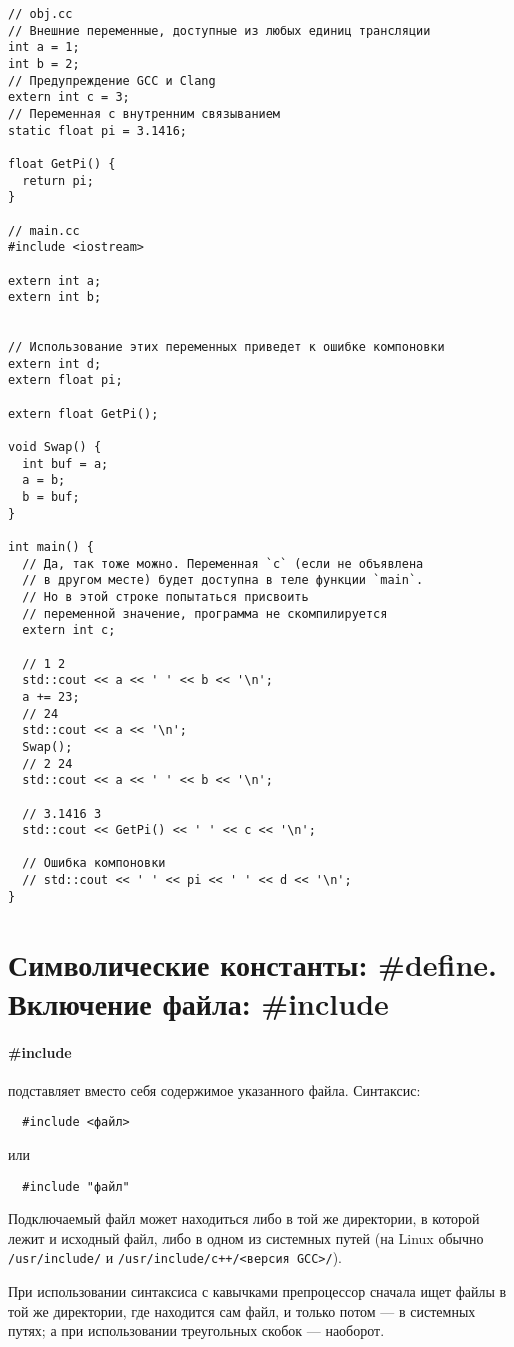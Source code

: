 \begin{verbatim}
// obj.cc
// Внешние переменные, доступные из любых единиц трансляции
int a = 1;
int b = 2;
// Предупреждение GCC и Clang
extern int c = 3;
// Переменная с внутренним связыванием
static float pi = 3.1416;

float GetPi() {
  return pi;
}

// main.cc
#include <iostream>

extern int a;
extern int b;


// Использование этих переменных приведет к ошибке компоновки
extern int d;
extern float pi;

extern float GetPi();

void Swap() {
  int buf = a;
  a = b;
  b = buf;
}

int main() {
  // Да, так тоже можно. Переменная `c` (если не объявлена
  // в другом месте) будет доступна в теле функции `main`.
  // Но в этой строке попытаться присвоить
  // переменной значение, программа не скомпилируется
  extern int c;
  
  // 1 2
  std::cout << a << ' ' << b << '\n';
  a += 23;
  // 24
  std::cout << a << '\n';
  Swap();
  // 2 24
  std::cout << a << ' ' << b << '\n';

  // 3.1416 3
  std::cout << GetPi() << ' ' << c << '\n';

  // Ошибка компоновки
  // std::cout << ' ' << pi << ' ' << d << '\n';
}

\end{verbatim}


\section{Символические константы: \#define. Включение файла: \#include}
\paragraph{\#include} подставляет вместо себя содержимое указанного файла. Синтаксис:
\begin{verbatim}
  #include <файл>
\end{verbatim}
или
\begin{verbatim}
  #include "файл"
\end{verbatim}
Подключаемый файл может находиться либо в той же директории, в которой лежит и исходный файл,
либо в одном из системных путей (на Linux обычно \verb|/usr/include/| и \verb|/usr/include/c++/<версия GCC>/|).

При использовании синтаксиса с кавычками препроцессор сначала ищет файлы в той же директории,
где находится сам файл, и только потом --- в системных путях; а при использовании треугольных скобок --- наоборот.

